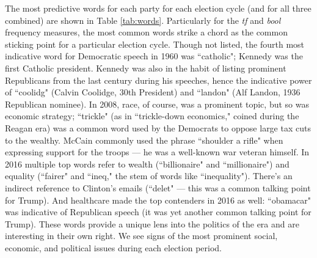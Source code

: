 \documentclass[aps, prl, reprint, showpacs]{revtex4-1}
\begin{document}
The most predictive words for each party for each election cycle (and for all three combined) are shown in Table \ref{tab:words}. Particularly for the \textit{tf} and \textit{bool} frequency measures, the most common words strike a chord as the common sticking point for a particular election cycle. Though not listed, the fourth most indicative word for Democratic speech in 1960 was ``catholic"; Kennedy was the first Catholic president. Kennedy was also in the habit of listing prominent Republicans from the last century during his speeches, hence the indicative power of ``coolidg" (Calvin Coolidge, 30th President) and ``landon" (Alf Landon, 1936 Republican nominee). In 2008, race, of course, was a prominent topic, but so was economic strategy; ``trickle" (as in ``trickle-down economics," coined during the Reagan era) was a common word used by the Democrats to oppose large tax cuts to the wealthy. McCain commonly used the phrase ``shoulder a rifle" when expressing support for the troops --- he was a well-known war veteran himself. In 2016 multiple top words refer to wealth (``billionaire" and ``millionaire") and equality (``fairer" and ``ineq," the stem of words like ``inequality"). There's an indirect reference to Clinton's emails (``delet" --- this was a common talking point for Trump). And healthcare made the top contenders in 2016 as well: ``obamacar" was indicative of Republican speech (it was yet another common talking point for Trump). These words provide a unique lens into the politics of the era and are interesting in their own right. We see signs of the most prominent social, economic, and political issues during each election period.
\end{document}

